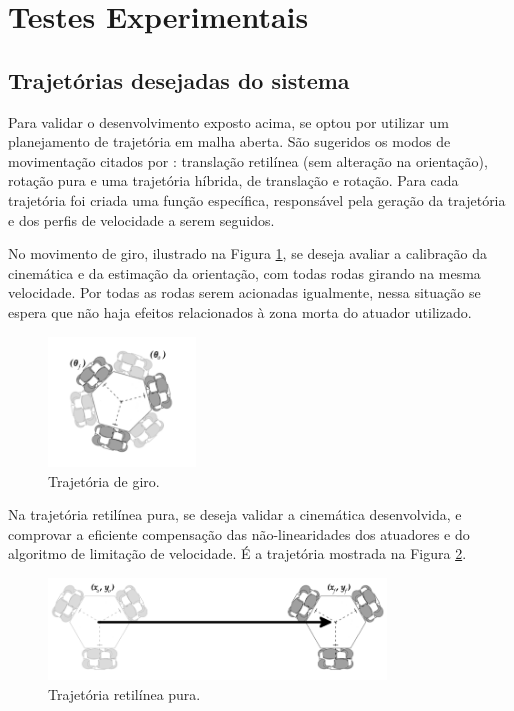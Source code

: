 
\section{Testes Experimentais}
\label{sec:experimental}
\subsection{Trajetórias desejadas do sistema}

Para validar o desenvolvimento exposto acima, se optou por utilizar um planejamento de trajetória em malha aberta. São sugeridos os modos de movimentação citados por \citet{loh2003mechatronics}: translação retilínea (sem alteração na orientação), rotação pura e uma trajetória híbrida, de translação e rotação. Para cada trajetória foi criada uma função específica, responsável pela geração da trajetória e dos perfis de velocidade a serem seguidos.

No movimento de giro, ilustrado na Figura \ref{fig:giro}, se deseja avaliar a calibração da cinemática e da estimação da orientação, com todas rodas girando na mesma velocidade. Por todas as rodas serem acionadas igualmente, nessa situação se espera que não haja efeitos relacionados à zona morta do atuador utilizado.

\begin{figure}[h]
  \centering
  \includegraphics[width = 0.35\textwidth]{imagens/giro}
  \caption{Trajetória de giro.}
  \label{fig:giro}
\end{figure}

Na trajetória retilínea pura, se deseja validar a cinemática desenvolvida, e comprovar a eficiente compensação das não-linearidades dos atuadores e do algoritmo de limitação de velocidade. É a trajetória mostrada na Figura \ref{fig:reta}.

\begin{figure}[h]
  \centering
  \includegraphics[width = 0.8\textwidth]{imagens/reta}
  \caption{Trajetória retilínea pura.}
  \label{fig:reta}
\end{figure}

